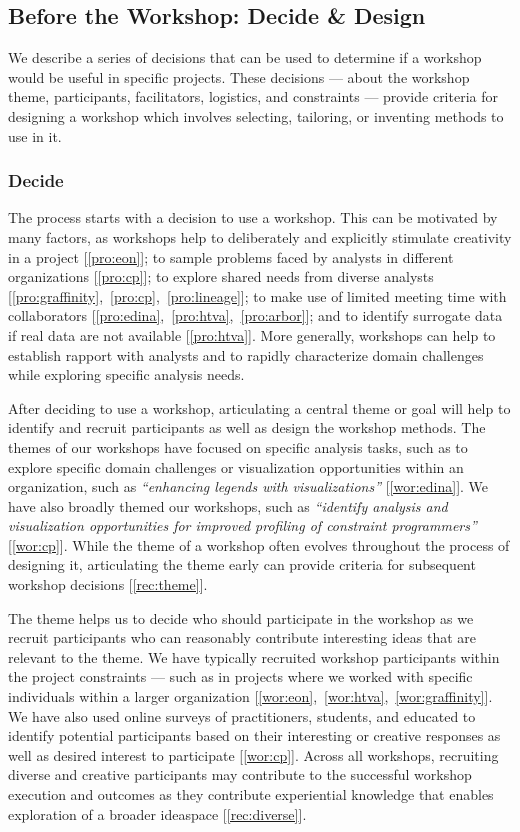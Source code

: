 \subsection{Before the Workshop: Decide \& Design}

We describe a series of decisions that can be used to determine if a workshop would be useful in specific projects. These decisions --- about the workshop theme, participants, facilitators, logistics, and constraints --- provide criteria for designing a workshop which involves selecting, tailoring, or inventing methods to use in it.

\subsubsection{Decide}

The process starts with a decision to use a workshop. This can be motivated by many factors, as workshops help to deliberately and explicitly stimulate creativity in a project [\ref{pro:eon}]; to sample problems faced by analysts in different organizations [\ref{pro:cp}]; to explore shared needs from diverse analysts [\ref{pro:graffinity},~\ref{pro:cp},~\ref{pro:lineage}]; to make use of limited meeting time with collaborators [\ref{pro:edina},~\ref{pro:htva},~\ref{pro:arbor}]; and to identify surrogate data if real data are not available [\ref{pro:htva}]. More generally, workshops can help to establish rapport with analysts and to rapidly characterize domain challenges while exploring specific analysis needs.

After deciding to use a workshop, articulating a central theme or goal will help to identify and recruit participants as well as design the workshop methods. The themes of our workshops have focused on specific analysis tasks, such as to explore specific domain challenges or visualization opportunities within an organization, such as \emph{``enhancing legends with visualizations''} [\ref{wor:edina}]. We have also broadly themed our workshops, such as \emph{``identify analysis and visualization opportunities for improved profiling of constraint programmers''} [\ref{wor:cp}]. While the theme of a workshop often evolves throughout the process of designing it, articulating the theme early can provide criteria for subsequent workshop decisions [\ref{rec:theme}].

The theme helps us to decide who should participate in the workshop as we recruit participants who can reasonably contribute interesting ideas that are relevant to the theme. We have typically recruited workshop participants within the project constraints --- such as in projects where we worked with specific individuals within a larger organization [\ref{wor:eon},~\ref{wor:htva},~\ref{wor:graffinity}]. We have also used online surveys of practitioners, students, and educated to identify potential participants based on their interesting or creative responses as well as desired interest to participate [\ref{wor:cp}]. Across all workshops, recruiting diverse and creative participants may contribute to the successful workshop execution and outcomes as they contribute experiential knowledge that enables exploration of a broader ideaspace [\ref{rec:diverse}].


